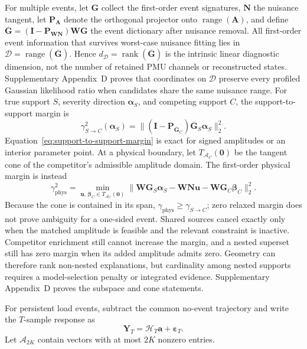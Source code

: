 For multiple events, let $\bm G$ collect the first-order event signatures,
$\bm N$ the nuisance tangent, let $\bm P_{\bm A}$ denote the orthogonal
projector onto $\operatorname{range}(\bm A)$, and define
$\overline{\bm G}=(\bm I-\bm P_{\bm W\bm N})\bm W\bm G$ the event dictionary
after nuisance removal. All first-order event information that survives
worst-case nuisance fitting lies in
$\mathcal D=\operatorname{range}(\overline{\bm G})$. Hence
$d_{\mathcal D}=\operatorname{rank}(\overline{\bm G})$ is the intrinsic linear
diagnostic dimension, not the number of retained PMU channels or reconstructed
states. Supplementary Appendix~D proves that coordinates on $\mathcal D$
preserve every profiled Gaussian likelihood ratio when candidates share the
same nuisance range. For true support $S$, severity direction
$\bm\alpha_S$, and competing support $C$, the support-to-support margin is
\begin{equation}
 \gamma_{S\rightarrow C}^2(\bm\alpha_S)
 =\|\left(\bm I-\bm P_{\overline{\bm G}_C}\right)
 \overline{\bm G}_S\bm\alpha_S\|_2^2.
 \label{eq:support-to-support-margin}
\end{equation}
Equation~\eqref{eq:support-to-support-margin} is exact for signed amplitudes or
an interior parameter point. At a physical boundary, let
$T_{\mathcal A_C}(\bm0)$ be the tangent cone of the competitor's admissible
amplitude domain. The first-order physical margin is instead
\begin{equation}
 \gamma_{\mathrm{phys}}^2
 =\min_{\bm u,\,\bm\beta_C\in T_{\mathcal A_C}(\bm0)}
 \|\bm W\bm G_S\bm\alpha_S-\bm W\bm N\bm u
       -\bm W\bm G_C\bm\beta_C\|_2^2.
 \label{eq:physical-cone-margin}
\end{equation}
Because the cone is contained in its span,
$\gamma_{\mathrm{phys}}\ge\gamma_{S\rightarrow C}$; zero relaxed margin does
not prove ambiguity for a one-sided event. Shared sources cancel exactly only
when the matched amplitude is feasible and the relevant constraint is inactive.
Competitor enrichment still cannot increase the margin, and a nested superset
still has zero margin when its added amplitude admits zero. Geometry can
therefore rank non-nested explanations, but cardinality among nested supports
requires a model-selection penalty or integrated evidence. Supplementary
Appendix~D proves the subspace and cone statements.

For persistent load events, subtract the common no-event trajectory and write the $T$-sample response as
\begin{equation}
 \bm Y_T=\mathcal H_T\bm a+\bm\varepsilon_T.
 \label{eq:persistent-event-model}
\end{equation}
Let $\mathcal A_{2K}$ contain vectors with at most $2K$ nonzero entries.

